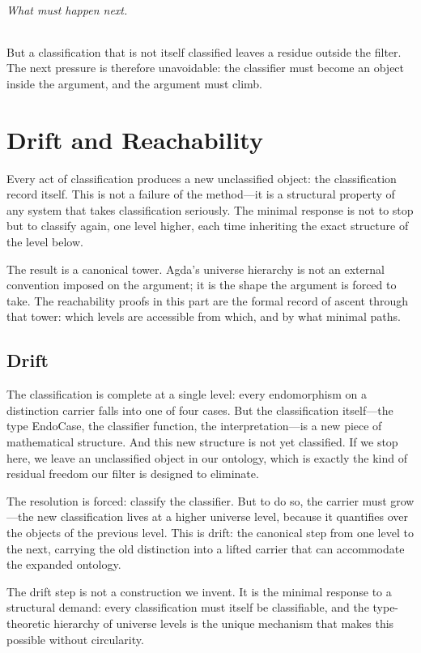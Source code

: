 \documentclass[11pt,a4paper]{book}
\def\texttt#1{#1}%
\begin{document}
\paragraph{What must happen next.}
But a classification that is not itself classified leaves a residue outside the filter. The next pressure is therefore unavoidable: the classifier must become an object inside the argument, and the argument must climb.

\part{Drift and Reachability}

Every act of classification produces a new unclassified object: the classification record itself. This is not a failure of the method---it is a structural property of any system that takes classification seriously. The minimal response is not to stop but to classify again, one level higher, each time inheriting the exact structure of the level below.

The result is a canonical tower. Agda's universe hierarchy is not an external convention imposed on the argument; it is the shape the argument is forced to take. The reachability proofs in this part are the formal record of ascent through that tower: which levels are accessible from which, and by what minimal paths.

\chapter{Drift}

The classification is complete at a single level: every endomorphism on a distinction carrier falls into one of four cases. But the classification itself—the type \texttt{EndoCase}, the classifier function, the interpretation—is a new piece of mathematical structure. And this new structure is not yet classified. If we stop here, we leave an unclassified object in our ontology, which is exactly the kind of residual freedom our filter is designed to eliminate.

The resolution is forced: classify the classifier. But to do so, the carrier must grow—the new classification lives at a higher universe level, because it quantifies over the objects of the previous level. This is drift: the canonical step from one level to the next, carrying the old distinction into a lifted carrier that can accommodate the expanded ontology.

The drift step is not a construction we invent. It is the minimal response to a structural demand: every classification must itself be classifiable, and the type-theoretic hierarchy of universe levels is the unique mechanism that makes this possible without circularity.
\end{document}
